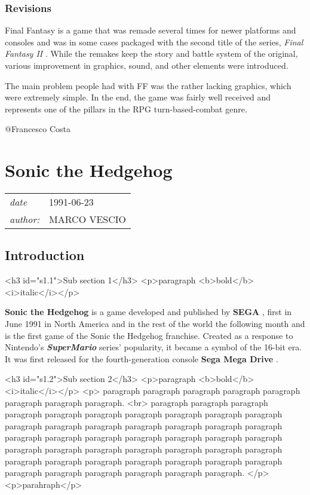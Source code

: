 \documentclass[a4paper,10pt]{book}
\newcommand{\pageHeader}[4]{
    \section{#1}
    \vspace{-0.3cm}
    \begin{table}[h!]
     \begin{tabular}{ll}
        \hline
        \textit{date} & #2 \\
        \textit{author: } & #3\\
        \hline
     \end{tabular}
    \end{table}
    \vspace{-0.3cm}
}
\begin{document}
 
 \subsubsection{Revisions }
 
          Final Fantasy is a game that was remade several times for newer platforms
          and consoles and was in some cases packaged with the second title of the
          series,  \textit{Final Fantasy II }. While the remakes keep the story and battle
          system of the original, various improvement in graphics, sound, and other
          elements were introduced.
           
          The main problem people had with FF was the rather lacking graphics, which were
          extremely simple. In the end, the game was fairly well received and represents
          one of the pillars in the RPG turn-based-combat genre.
         
 
 
 @Francesco Costa 
 
 \newpage\pageHeader{Sonic the Hedgehog}{1991-06-23}{MARCO VESCIO}{A webpage about the first Sonic game}
 \subsection{Introduction }
  <h3 id="s1.1">Sub section 1</h3>
        <p>paragraph <b>bold</b> <i>italic</i></p> 
 
 \textbf{Sonic the Hedgehog }  is a game developed and published by  \textbf{SEGA } , first in June 1991 in North America and in the rest of the world the following month and is the first game of the Sonic the Hedgehog franchise. 
          Created as a response to Nintendo's  \textbf{\textit{SuperMario }}  series' popularity, it became a symbol of the 16-bit era. It was first released for the fourth-generation console  \textbf{Sega Mega Drive } .
         
  <h3 id="s1.2">Sub section 2</h3>
        <p>paragraph <b>bold</b> <i>italic</i></p>
        <p>
          paragraph paragraph paragraph paragraph paragraph paragraph paragraph paragraph. <br>
          paragraph paragraph paragraph paragraph paragraph paragraph paragraph paragraph paragraph paragraph paragraph paragraph paragraph paragraph paragraph paragraph paragraph paragraph paragraph paragraph paragraph paragraph paragraph paragraph paragraph paragraph paragraph paragraph paragraph paragraph paragraph paragraph paragraph paragraph paragraph paragraph paragraph paragraph paragraph paragraph paragraph paragraph paragraph paragraph.
        </p>
        <p>parahraph</p> 
\end{document}
